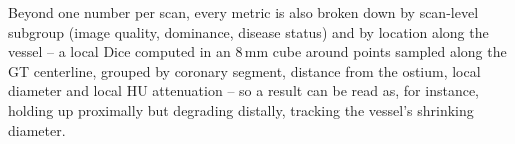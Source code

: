 Beyond one number per scan, every metric is also broken down by scan-level subgroup (image
quality, dominance, disease status) and by location along the vessel -- a local Dice computed in
an 8\,mm cube around points sampled along the GT centerline, grouped by coronary segment,
distance from the ostium, local diameter and local HU attenuation -- so a result can be read as,
for instance, holding up proximally but degrading distally, tracking the vessel's shrinking
diameter.
